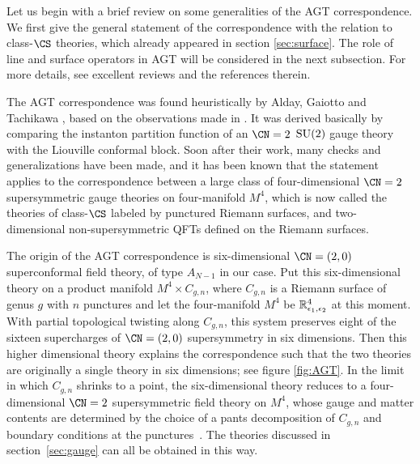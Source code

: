 Let us begin with a brief review on some generalities of
the AGT correspondence.
We first give the general statement
of the correspondence with the relation to class-$\CS$ theories,
which already appeared in section \ref{sec:surface}.
The role of line and surface operators in AGT will be considered in the next subsection.
For more details, see excellent reviews \cite{LeFloch:2020uop,Okuda:2014fja,Gukov:2014gja}
and the references therein.

The AGT correspondence was found heuristically by Alday,
Gaiotto and Tachikawa \cite{Alday:2009aq}, based on the observations
made in \cite{Gaiotto:2009we}. It was derived basically by comparing
the instanton partition function \cite{Nekrasov:2002qd} of an $\CN =2$ $\mathrm{SU}(2)$
gauge theory with the Liouville conformal block.
Soon after their work, many checks and generalizations have been made, and
it has been known that the statement applies to the correspondence between a large class
of four-dimensional $\CN = 2$ supersymmetric gauge theories on four-manifold $M^4$,
which is now called the theories of class-$\CS$ labeled by punctured Riemann
surfaces, %
and two-dimensional non-supersymmetric QFTs defined on the Riemann surfaces.

The origin of the AGT correspondence is six-dimensional $\CN = (2,0)$ superconformal field theory,
of type $A_{N-1}$ in our case.
Put this six-dimensional theory on a product manifold $M^4\times C_{g,n}$,
where $C_{g,n}$ is a Riemann surface of genus $g$ with $n$ punctures
and let the four-manifold $M^4$ be
$\mathbb{R}^4_{\epsilon_1,\epsilon_2}$
at this moment.
With partial topological twisting along $C_{g,n}$, this system
preserves eight of the sixteen supercharges of $\CN = (2,0)$
supersymmetry in six dimensions.
Then this higher dimensional
theory explains the correspondence such that the two theories are
originally a single theory in six dimensions; see figure \ref{fig:AGT}.
In the limit in which $C_{g,n}$ shrinks to a point, the
six-dimensional theory reduces to a four-dimensional $\CN = 2$
supersymmetric field theory on $M^4$, %
whose gauge and matter
contents are determined by the choice of a pants decomposition of
$C_{g,n}$ and boundary conditions at the
punctures~\cite{Gaiotto:2009we, Gaiotto:2009hg}.  The theories
discussed in section~\ref{sec:gauge} can all be obtained in this way.



